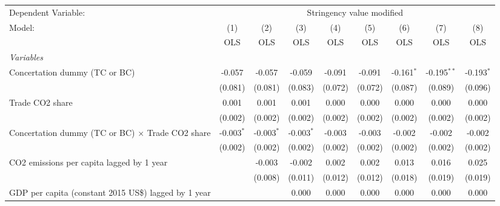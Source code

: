 
\begingroup
\centering
\begin{tabular}{lcccccccc}
   \toprule
   Dependent Variable: & \multicolumn{8}{c}{Stringency value modified}\\
   Model:                                                    & (1)          & (2)          & (3)          & (4)     & (5)     & (6)          & (7)           & (8)\\  
                                                             &  OLS         & OLS          & OLS          & OLS     & OLS     & OLS          & OLS           & OLS\\  
   \midrule
   \emph{Variables}\\
   Concertation dummy (TC or BC)                             & -0.057       & -0.057       & -0.059       & -0.091  & -0.091  & -0.161$^{*}$ & -0.195$^{**}$ & -0.193$^{*}$\\   
                                                             & (0.081)      & (0.081)      & (0.083)      & (0.072) & (0.072) & (0.087)      & (0.089)       & (0.096)\\   
   Trade CO2 share                                           & 0.001        & 0.001        & 0.001        & 0.000   & 0.000   & 0.000        & 0.000         & 0.000\\   
                                                             & (0.002)      & (0.002)      & (0.002)      & (0.002) & (0.002) & (0.002)      & (0.002)       & (0.002)\\   
   Concertation dummy (TC or BC) $\times$ Trade CO2 share    & -0.003$^{*}$ & -0.003$^{*}$ & -0.003$^{*}$ & -0.003  & -0.003  & -0.002       & -0.002        & -0.002\\   
                                                             & (0.002)      & (0.002)      & (0.002)      & (0.002) & (0.002) & (0.002)      & (0.002)       & (0.002)\\   
   CO2 emissions per capita lagged by 1 year                 &              & -0.003       & -0.002       & 0.002   & 0.002   & 0.013        & 0.016         & 0.025\\   
                                                             &              & (0.008)      & (0.011)      & (0.012) & (0.012) & (0.018)      & (0.019)       & (0.019)\\   
   GDP per capita (constant 2015 US\$) lagged by 1 year      &              &              & 0.000        & 0.000   & 0.000   & 0.000        & 0.000         & 0.000\\   

\end{tabular}
